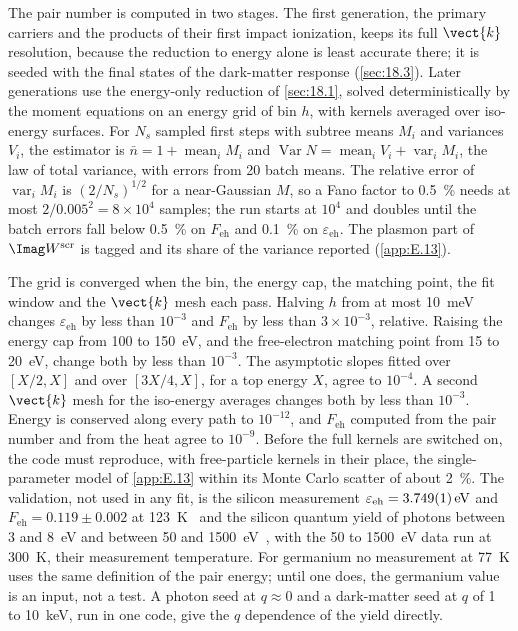 The pair number is computed in two stages. The first generation, the primary carriers and the products of their first impact ionization, keeps its full $\vect{k}$ resolution, because the reduction to energy alone is least accurate there; it is seeded with the final states of the dark-matter response (\cref{sec:18.3}). Later generations use the energy-only reduction of \cref{sec:18.1}, solved deterministically by the moment equations on an energy grid of bin $h$, with kernels averaged over iso-energy surfaces. For $N_s$ sampled first steps with subtree means $M_i$ and variances $V_i$, the estimator is $\bar n = 1 + \operatorname{mean}_iM_i$ and $\operatorname{Var}N = \operatorname{mean}_iV_i + \operatorname{var}_iM_i$, the law of total variance, with errors from 20 batch means. The relative error of $\operatorname{var}_iM_i$ is $(2/N_s)^{1/2}$ for a near-Gaussian $M$, so a Fano factor to \SI{0.5}{\percent} needs at most $2/0.005^2 = 8\times10^4$ samples; the run starts at $10^4$ and doubles until the batch errors fall below \SI{0.5}{\percent} on $F_{\mathrm{eh}}$ and \SI{0.1}{\percent} on $\varepsilon_{\mathrm{eh}}$. The plasmon part of $\Imag W^{\mathrm{scr}}$ is tagged and its share of the variance reported (\cref{app:E.13}).

The grid is converged when the bin, the energy cap, the matching point, the fit window and the $\vect{k}$ mesh each pass. Halving $h$ from at most \SI{10}{meV} changes $\varepsilon_{\mathrm{eh}}$ by less than $10^{-3}$ and $F_{\mathrm{eh}}$ by less than $3\times10^{-3}$, relative. Raising the energy cap from 100 to \SI{150}{eV}, and the free-electron matching point from 15 to \SI{20}{eV}, change both by less than $10^{-3}$. The asymptotic slopes fitted over $[X/2, X]$ and over $[3X/4, X]$, for a top energy $X$, agree to $10^{-4}$. A second $\vect{k}$ mesh for the iso-energy averages changes both by less than $10^{-3}$. Energy is conserved along every path to $10^{-12}$, and $F_{\mathrm{eh}}$ computed from the pair number and from the heat agree to $10^{-9}$. Before the full kernels are switched on, the code must reproduce, with free-particle kernels in their place, the single-parameter model of \cref{app:E.13} within its Monte Carlo scatter of about \SI{2}{\percent}. The validation, not used in any fit, is the silicon measurement $\varepsilon_{\mathrm{eh}} = \SI{3.749 \pm 0.001}{eV}$ and $F_{\mathrm{eh}} = 0.119 \pm 0.002$ at \SI{123}{K}~\cite{rodrigues2021absolute} and the silicon quantum yield of photons between 3 and \SI{8}{eV} and between 50 and \SI{1500}{eV}~\cite{ramanathan2020ionization}, with the 50 to \SI{1500}{eV} data run at \SI{300}{K}, their measurement temperature. For germanium no measurement at \SI{77}{K} uses the same definition of the pair energy; until one does, the germanium value is an input, not a test. A photon seed at $q \approx 0$ and a dark-matter seed at $q$ of 1 to \SI{10}{keV}, run in one code, give the $q$ dependence of the yield directly.

